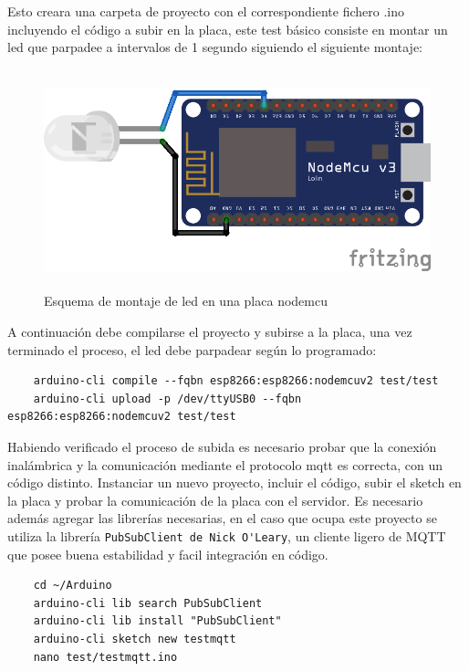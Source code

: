 Esto creara una carpeta de proyecto con el correspondiente fichero .ino incluyendo el código a subir en la placa, este test básico consiste en montar un led que parpadee a intervalos de 1 segundo siguiendo el siguiente montaje:

\begin{figure}[hbt!]
\centering
\includegraphics[height=2.5in]{figures/nodemcu-test1.png}
\caption[Montaje placa nodeMCU con led]{Esquema de montaje de led en una placa nodemcu}
    \label{figure1}
\end{figure}

A continuación debe compilarse el proyecto y subirse a la placa, una vez terminado el proceso, el led debe parpadear según lo programado:

\begin{verbatim}
    arduino-cli compile --fqbn esp8266:esp8266:nodemcuv2 test/test
    arduino-cli upload -p /dev/ttyUSB0 --fqbn esp8266:esp8266:nodemcuv2 test/test
\end{verbatim}

Habiendo verificado el proceso de subida es necesario probar que la conexión inalámbrica y la comunicación mediante el protocolo \gls{mqtt} es correcta, con un código distinto. Instanciar un nuevo proyecto, incluir el código, subir el \gls{sketch} en la placa y probar la comunicación de la placa con el servidor. Es necesario además agregar las librerías necesarias, en el caso que ocupa este proyecto se utiliza la librería \verb|PubSubClient de Nick O'Leary|, un cliente ligero de MQTT que posee buena estabilidad y facil integración en código.

\begin{verbatim}
    cd ~/Arduino
    arduino-cli lib search PubSubClient
    arduino-cli lib install "PubSubClient"
    arduino-cli sketch new testmqtt
    nano test/testmqtt.ino
\end{verbatim}

